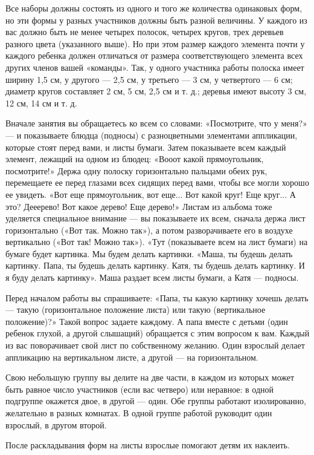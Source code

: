 \documentclass{book}
\begin{document}
Все наборы должны состоять из одного и того же количества одинаковых
форм, но эти формы у разных участников должны быть разной величины. У
каждого из вас должно быть не менее четырех полосок, четырех кругов,
трех деревьев разного цвета (указанного выше). Но при этом размер
каждого элемента почти у каждого ребенка должен отличаться от размера
соответствующего элемента всех других членов вашей «команды». Так, у
одного участника работы полоска имеет ширину 1,5 см, у другого --- 2,5
см, у третьего --- 3 см, у четвертого --- 6 см; диаметр кругов
составляет 2 см, 5 см, 2,5 см и т. д.; деревья имеют высоту 3 см, 12 см,
14 см и т. д.

Вначале занятия вы обращаетесь ко всем со словами: «Посмотрите, что у
меня?» --- и показываете блюдца (подносы) с разноцветными элементами
аппликации, которые стоят перед вами, и листы бумаги. Затем показываете
всем каждый элемент, лежащий на одном из блюдец: «Вооот какой
прямоугольник, посмотрите!» Держа одну полоску горизонтально пальцами
обеих рук, перемещаете ее перед глазами всех сидящих перед вами, чтобы
все могли хорошо ее увидеть. «Вот еще прямоугольник, вот еще... Вот
какой круг! Еще круг... А это? Дееерево! Вот какое дерево! Еще дерево!»
Листам из альбома тоже уделяется специальное внимание --- вы показываете
их всем, сначала держа лист горизонтально («Вот так. Можно так»), а
потом разворачиваете его в воздухе вертикально («Вот так! Можно так»).
«Тут (показываете всем на лист бумаги) на бумаге будет картинка. Мы
будем делать картинки. «Маша, ты будешь делать картинку. Папа, ты будешь
делать картинку. Катя, ты будешь делать картинку. И я буду делать
картинку». Маша раздает всем листы бумаги, а Катя --- подносы.

Перед началом работы вы спрашиваете: «Папа, ты какую картинку хочешь
делать --- такую (горизонтальное положение листа) или такую
(вертикальное положение)?» Такой вопрос задаете каждому. А папа вместе с
детьми (один ребенок глухой, а другой слышащий) обращается с этим
вопросом к вам. Каждый из вас поворачивает свой лист по собственному
желанию. Один взрослый делает аппликацию на вертикальном листе, а другой
--- на горизонтальном.

Свою небольшую группу вы делите на две части, в каждом из которых может
быть равное число участников (если вас четверо) или неравное: в одной
подгруппе окажется двое, в другой --- один. Обе группы работают
изолированно, желательно в разных комнатах. В одной группе работой
руководит один взрослый, в другом второй.

После раскладывания форм на листы взрослые помогают детям их наклеить.
\end{document}
